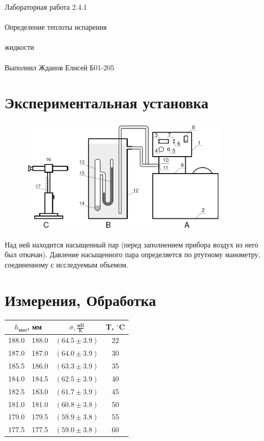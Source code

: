 \documentclass{astroedu-lab}
\begin{document}
\begin{problem}{\huge Лабораторная работа 2.4.1\\\\Определение теплоты испарения\\\\жидкости\\\\Выполнил Жданов Елисей Б01-205}
\section{Экспериментальная установка}

\begin{figure}[!h]
	\centering
	\includegraphics[width=0.9\textwidth]{установка.png}
	\label{fig:boiler}
\end{figure}

Над ней находится насыщенный пар (перед заполнением прибора воздух из него был откачан). Давление насыщенного пара определяется по ртутному манометру, соединенному с исследуемым объемом.

\section{Измерения, Обработка}

\begin{center}
\begin{tabular}{|c|c|c|c|}
\hline 
\multicolumn{2}{|c|}{$h_\text{ман}$, мм} & $\sigma, \frac{\text{мН}}{\text{К}}$ & T, $^\circ$C \\
\hline
188.0 & 188.0 & $(64.5 \pm 3.9)$ & 22\\
187.0 & 187.0 & $(64.0 \pm 3.9)$ & 30\\
185.5 & 186.0 & $(63.3 \pm 3.9)$ & 35\\
184.0 & 184.5 & $(62.5 \pm 3.9)$ & 40\\
182.5 & 183.0 & $(61.7 \pm 3.9)$ & 45\\
181.0 & 181.0 & $(60.8 \pm 3.8)$ & 50\\
179.0 & 179.5 & $(59.9 \pm 3.8)$ & 55\\
177.5 & 177.5 & $(59.0 \pm 3.8)$ & 60\\
\hline
\end{tabular}
\end{center}



\end{problem}
\end{document}
